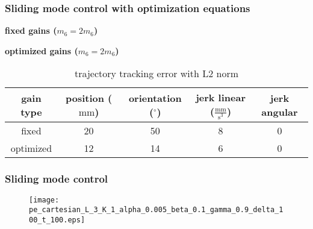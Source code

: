 	\begin{frame}
		\frametitle{Sliding mode control with optimization equations}
		
		\fboxrule=3pt
		\begin{minipage}[t]{0.45\textwidth}
			\graphicspath{{images/methodology/SMC/exp1/circular/uncertainty_100_alpha_0/}}
			\centering
			{\large \textbf{fixed gains ($m_6=2m_6$)}}
		\end{minipage}
		\hspace{.08\textwidth}
		\begin{minipage}[t]{0.45\textwidth}
			\graphicspath{{images/methodology/SMC/exp1/circular/uncertainty_100_alpha_0/}}
			\centering
			{\large \textbf{optimized gains ($m_6=2 m_6$)}}
		\end{minipage}
		
		\begin{table}
			\caption{trajectory tracking error with L2 norm}
			\centering
			\begin{tabular}{c c c c c}
			\toprule
			gain type & position ($\mathrm{mm}$) & orientation ($^\circ$) & jerk linear ($\mathrm{\frac{mm}{s^3}}$) & jerk angular \\
			\midrule
			fixed  & 20 & 50 & 8 & 0 \\ 
			optimized & 12 & 14 & 6 & 0  \\
			\bottomrule
			\end{tabular}
		\end{table}

	\end{frame}	
	
	
	\begin{frame}
		\frametitle{Sliding mode control}
		\graphicspath{{/home/jhon/Desktop/journal_presentation/images/methodology/SMC/exp1/circular}}
		\begin{figure}
			\centering
			\texttt{[image: pe\_cartesian\_L\_3\_K\_1\_alpha\_0.005\_beta\_0.1\_gamma\_0.9\_delta\_100\_t\_100.eps]}
		\end{figure}
	\end{frame}
